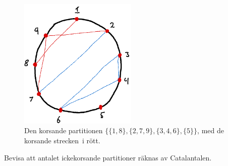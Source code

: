 \documentclass{tufte-handout}
\begin{document}
\begin{xca}
    \begin{figure}
        \centering
        \includegraphics[width=0.5\textwidth]{graphics/crossing_partition.png}
        \caption{Den korsande partitionen $\{\{1,8\},\{2,7,9\},\{3,4,6\},\{5\}\}$, med de korsande strecken\, i rött.}
        \label{fig:crossing_partition}
    \end{figure}

    Bevisa att antalet ickekorsande partitioner räknas av Catalantalen.
\end{xca}

\newpage



\end{document}
